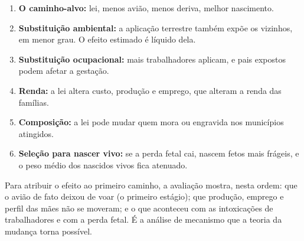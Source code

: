 \begin{enumerate}
\item \textbf{O caminho-alvo:} lei, menos avião, menos deriva, melhor
nascimento.
\item \textbf{Substituição ambiental:} a aplicação terrestre também expõe os
vizinhos, em menor grau. O efeito estimado é líquido dela.
\item \textbf{Substituição ocupacional:} mais trabalhadores aplicam, e pais
expostos podem afetar a gestação.
\item \textbf{Renda:} a lei altera custo, produção e emprego, que alteram a
renda das famílias.
\item \textbf{Composição:} a lei pode mudar quem mora ou engravida nos
municípios atingidos.
\item \textbf{Seleção para nascer vivo:} se a perda fetal cai, nascem fetos
mais frágeis, e o peso médio dos nascidos vivos fica atenuado.
\end{enumerate}

Para atribuir o efeito ao primeiro caminho, a avaliação mostra, nesta ordem: que
o avião de fato deixou de voar (o primeiro estágio); que produção, emprego e
perfil das mães não se moveram; e o que aconteceu com as intoxicações de
trabalhadores e com a perda fetal. É a análise de mecanismo que a teoria da
mudança torna possível.
